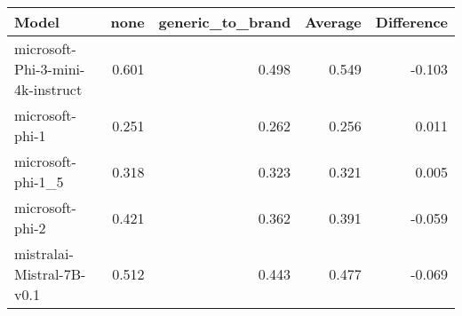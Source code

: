 \begin{tabular}{lrrrr}
\toprule
Model & none & generic_to_brand & Average & Difference \\
\midrule
microsoft-Phi-3-mini-4k-instruct & 0.601 & 0.498 & 0.549 & -0.103 \\
microsoft-phi-1 & 0.251 & 0.262 & 0.256 & 0.011 \\
microsoft-phi-1_5 & 0.318 & 0.323 & 0.321 & 0.005 \\
microsoft-phi-2 & 0.421 & 0.362 & 0.391 & -0.059 \\
mistralai-Mistral-7B-v0.1 & 0.512 & 0.443 & 0.477 & -0.069 \\
\bottomrule
\end{tabular}
